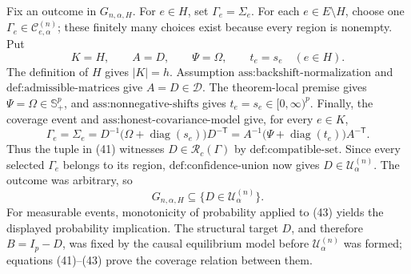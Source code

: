 Fix an outcome in \(G_{n,\alpha,H}\). For \(e\in H\), set \(\Gamma_e=\Sigma_e\). For each \(e\in E\setminus H\), choose one \(\Gamma_e\in\mathcal C^{(n)}_{e,\alpha}\); these finitely many choices exist because every region is nonempty. Put
\[
K=H,\qquad A=D,\qquad \Psi=\Omega,\qquad t_e=s_e\quad(e\in H).
\tag{41}
\]
The definition of \(H\) gives \(|K|=h\). Assumption \(\text{ass:backshift-normalization}\) and \(\text{def:admissible-matrices}\) give \(A=D\in\mathcal D\). The theorem-local premise gives \(\Psi=\Omega\in\mathbb S_+^p\), and \(\text{ass:nonnegative-shifts}\) gives \(t_e=s_e\in[0,\infty)^p\). Finally, the coverage event and \(\text{ass:honest-covariance-model}\) give, for every \(e\in K\),
\[
\Gamma_e
=\Sigma_e
=D^{-1}\bigl(\Omega+\operatorname{diag}(s_e)\bigr)D^{-\mathsf T}
=A^{-1}\bigl(\Psi+\operatorname{diag}(t_e)\bigr)A^{-\mathsf T}.
\tag{42}
\]
Thus the tuple in (41) witnesses \(D\in\mathcal R_c(\Gamma)\) by \(\text{def:compatible-set}\). Since every selected \(\Gamma_e\) belongs to its region, \(\text{def:confidence-union}\) now gives \(D\in\mathcal U^{(n)}_\alpha\). The outcome was arbitrary, so
\[
G_{n,\alpha,H}\subseteq\{D\in\mathcal U^{(n)}_\alpha\}.
\tag{43}
\]
For measurable events, monotonicity of probability applied to (43) yields the displayed probability implication. The structural target \(D\), and therefore \(B=I_p-D\), was fixed by the causal equilibrium model before \(\mathcal U^{(n)}_\alpha\) was formed; equations (41)--(43) prove the coverage relation between them.